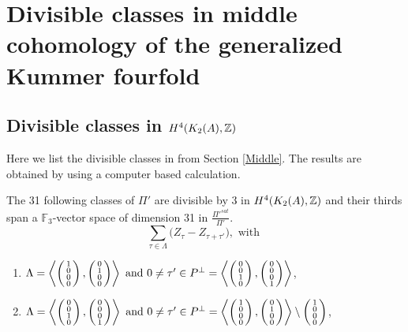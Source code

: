\chapter{Divisible classes in middle cohomology of the generalized Kummer fourfold}
\section{Divisible classes in \texorpdfstring{$H^4(\X,\Z)$}{middle cohomology of the generalized Kummer fourfold}}\label{SpecialClasses}
Here we list the divisible classes in from Section \ref{Middle}. The results are obtained by using a computer based calculation.
\begin{prop}\label{XXXI}
The 31 following classes of $\Pi'$ are divisible by 3 in $H^{4}(K_2(A),\Z)$ and their thirds span a $\mathbb F_3$-vector space of dimension 31 in $\frac{\Pi'^{sat}}{\Pi'}$.
$$\sum_{\tau\in\Lambda} \Big(Z_{\tau} - Z_{\tau+\tau'}\Big), \text{ with }$$
\begin{enumerate}
\item
$\Lambda=\plan{1\\0\\0\\0}{0\\1\\0\\0} \text{ and } 0\neq \tau'\in P^\perp = \plan{0\\0\\1\\0}{0\\0\\0\\1} $,

\item
$\Lambda=\plan{0\\0\\1\\0}{0\\0\\0\\1}  \text{ and } 0\neq \tau' \in P^\perp = \plan{1\\0\\0\\0}{0\\1\\0\\0} \setminus \vect{1\\0\\0\\0}$,


\end{enumerate}
\end{prop}
